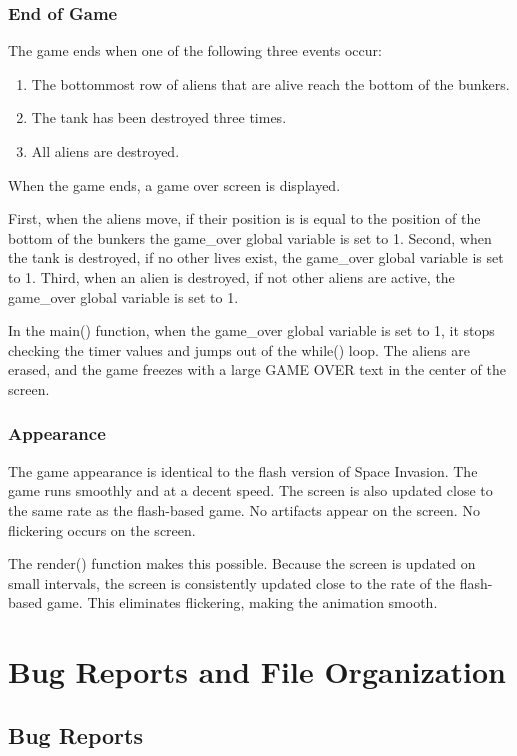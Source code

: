 \documentclass[11pt,letter,oneside]{report}
\begin{document}
\subsection{End of Game}
The game ends when one of the following three events occur:
\begin{enumerate}
\item The bottommost row of aliens that are alive reach the bottom of the bunkers.
\item The tank has been destroyed three times.
\item All aliens are destroyed.
\end{enumerate}
When the game ends, a game over screen is displayed.

First, when the aliens move, if their position is is equal to the position of the bottom of the bunkers the game\_over global variable is set to 1. Second, when the tank is destroyed, if no other lives exist, the game\_over global variable is set to 1. Third, when an alien is destroyed, if not other aliens are active, the game\_over global variable is set to 1.

In the main() function, when the game\_over global variable is set to 1, it stops checking the timer values and jumps out of the while() loop. The aliens are erased, and  the game freezes with a large GAME OVER text in the center of the screen.

\subsection{Appearance}
The game appearance is identical to the flash version of Space Invasion. The game runs smoothly and at a decent speed. The screen is also updated close to the same rate as the flash-based game. No artifacts appear on the screen. No flickering occurs on the screen.

The render() function makes this possible. Because the screen is updated on small intervals, the screen is consistently updated close to the rate of the flash-based game. This eliminates flickering, making the animation smooth.


\chapter{Bug Reports and File Organization}

\section{Bug Reports}
\end{document}
